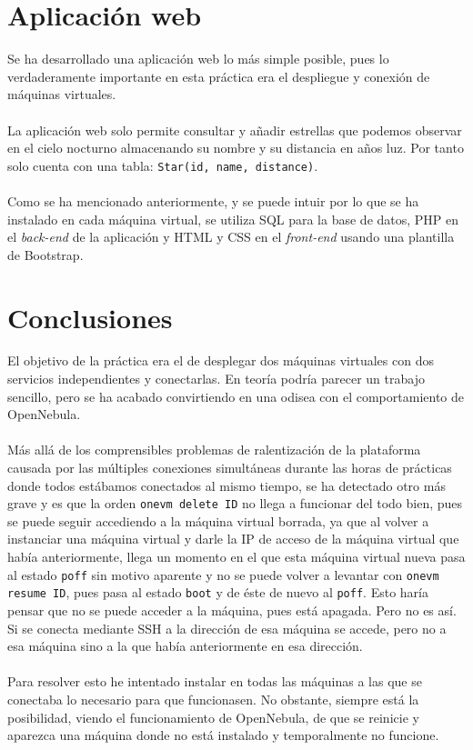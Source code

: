 \section{Aplicación web}

Se ha desarrollado una aplicación web lo más simple posible, pues lo verdaderamente importante en esta práctica era el despliegue y conexión de máquinas virtuales.
\\ \\
La aplicación web solo permite consultar y añadir estrellas que podemos observar en el cielo nocturno almacenando su nombre y su distancia en años luz. Por tanto solo cuenta con una tabla: \texttt{Star(id, name, distance)}.
\\ \\
Como se ha mencionado anteriormente, y se puede intuir por lo que se ha instalado en cada máquina virtual, se utiliza SQL para la base de datos, PHP en el \textit{back-end} de la aplicación y HTML y CSS en el \textit{front-end} usando una plantilla de Bootstrap.

\section{Conclusiones}

El objetivo de la práctica era el de desplegar dos máquinas virtuales con dos servicios independientes y conectarlas. En teoría podría parecer un trabajo sencillo, pero se ha acabado convirtiendo en una odisea con el comportamiento de OpenNebula.
\\ \\
Más allá de los comprensibles problemas de ralentización de la plataforma causada por las múltiples conexiones simultáneas durante las horas de prácticas donde todos estábamos conectados al mismo tiempo, se ha detectado otro más grave y es que la orden \texttt{onevm delete ID} no llega a funcionar del todo bien, pues se puede seguir accediendo a la máquina virtual borrada, ya que al volver a instanciar una máquina virtual y darle la IP de acceso de la máquina virtual que había anteriormente, llega un momento en el que esta máquina virtual nueva pasa al estado \texttt{poff} sin motivo aparente y no se puede volver a levantar con \texttt{onevm resume ID}, pues pasa al estado \texttt{boot} y de éste de nuevo al \texttt{poff}. Esto haría pensar que no se puede acceder a la máquina, pues está apagada. Pero no es así. Si se conecta mediante SSH a la dirección de esa máquina se accede, pero no a esa máquina sino a la que había anteriormente en esa dirección.
\\ \\
Para resolver esto he intentado instalar en todas las máquinas a las que se conectaba lo necesario para que funcionasen. No obstante, siempre está la posibilidad, viendo el funcionamiento de OpenNebula, de que se reinicie y aparezca una máquina donde no está instalado y temporalmente no funcione.

\newpage


